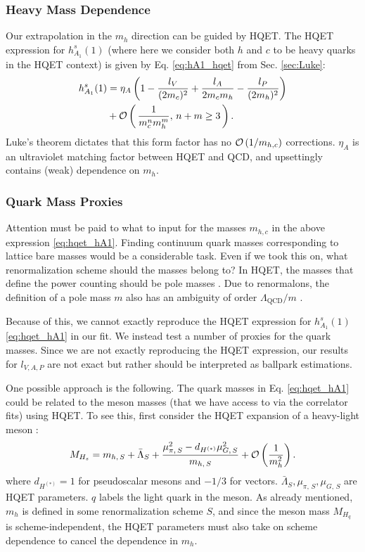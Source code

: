\subsubsection{Heavy Mass Dependence}
\label{sec:BsDsstar_heavymass}

Our extrapolation in the $m_h$ direction can be guided by HQET. The HQET expression for $h^s_{A_1}(1)$ (where here we consider both $h$ and $c$ to be heavy quarks in the HQET context) is given by Eq. \eqref{eq:hA1_hqet} from Sec. \ref{sec:Luke}:
\begin{align}
  \label{eq:hqet_hA1}
  h^s_{A_1}(1) &= \eta_A \left( 1 - {l_V\over (2m_c)^2} + {l_A \over 2 m_c m_h} - { l_P \over (2m_h)^2 } \right)  \\ \nonumber &+ \mathcal{O}\left( \, {1\over m_c^n m_h^m}, \, n+m\geq 3 \, \right).
\end{align}
Luke's theorem dictates that this form factor has no $\mathcal{O}\left( 1/m_{h,c} \right)$ corrections. $\eta_A$ is an ultraviolet matching factor between HQET and QCD, and upsettingly contains (weak) dependence on $m_h$.

\subsubsection{Quark Mass Proxies}
\label{sec:massambiguities}

Attention must be paid to what to input for the masses $m_{h,c}$ in the above expression \eqref{eq:hqet_hA1}. Finding continuum quark masses corresponding to lattice bare masses would be a considerable task. Even if we took this on, what renormalization scheme should the masses belong to? In HQET, the masses that define the power counting should be pole masses \cite{Neubert:1997gu}. Due to renormalons, the definition of a pole mass $m$ also has an ambiguity of order $\Lambda_{\text{QCD}}/m$ \cite{tHooft1979}.

Because of this, we cannot exactly reproduce the HQET expression for $h_{A_1}^s(1)$ \eqref{eq:hqet_hA1} in our fit. We instead test a number of proxies for the quark masses. Since we are not exactly reproducing the HQET expression, our results for $l_{V,A,P}$ are not exact but rather should be interpreted as ballpark estimations.

One possible approach is the following. The quark masses in Eq. \eqref{eq:hqet_hA1} could be related to the meson masses (that we have access to via the correlator fits) using HQET. To see this, first consider the HQET expansion of a heavy-light meson \cite{Bazavov:2018omf}:
\begin{align}
  \label{eq:hqet_mass}
  M_{H_s} = m_{h,\,S} + \bar{\Lambda}_S + { \mu^2_{\pi,\,S} - d_{H^{(*)}} \mu^2_{G,\,S} \over m_{h,\,S}} + \mathcal{O}\left({1\over m_h^2}\right).
\end{align}
where $d_{H^{(*)}} = 1$ for pseudoscalar mesons and $-1/3$ for vectors. $\bar{\Lambda}_S,\mu_{\pi,\,S},\mu_{G,\,S}$ are HQET parameters. $q$ labels the light quark in the meson. As already mentioned, $m_h$ is defined in some renormalization scheme $S$, and since the meson mass $M_{H_q}$ is scheme-independent, the HQET parameters must also take on scheme dependence to cancel the dependence in $m_h$.

